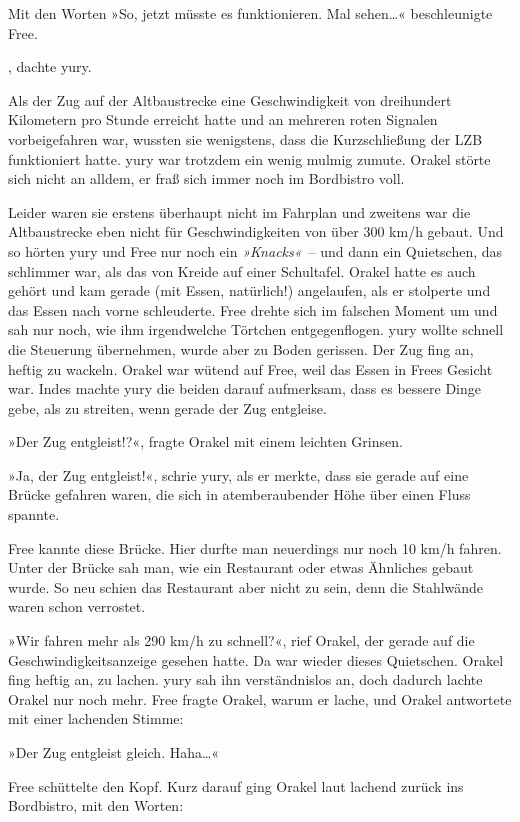 Mit den Worten »So, jetzt müsste es funktionieren. Mal sehen…« beschleunigte Free.

, dachte yury.

Als der Zug auf der Altbaustrecke eine Geschwindigkeit von dreihundert Kilometern pro Stunde erreicht hatte und an mehreren roten Signalen vorbeigefahren war, wussten sie wenigstens, dass die Kurzschließung der LZB funktioniert hatte. yury war trotzdem ein wenig mulmig zumute. Orakel störte sich nicht an alldem, er fraß sich immer noch im Bordbistro voll.

Leider waren sie erstens überhaupt nicht im Fahrplan und zweitens war die Altbaustrecke eben nicht für Geschwindigkeiten von über 300 km/h gebaut. Und so hörten yury und Free nur noch ein \textit{»Knacks«}~– und dann ein Quietschen, das schlimmer war, als das von Kreide auf einer Schultafel. Orakel hatte es auch gehört und kam gerade (mit Essen, natürlich!) angelaufen, als er stolperte und das Essen nach vorne schleuderte. Free drehte sich im falschen Moment um und sah nur noch, wie ihm irgendwelche Törtchen entgegenflogen. yury wollte schnell die Steuerung übernehmen, wurde aber zu Boden gerissen. Der Zug fing an, heftig zu wackeln. Orakel war wütend auf Free, weil das Essen in Frees Gesicht war. Indes machte yury die beiden darauf aufmerksam, dass es bessere Dinge gebe, als zu streiten, wenn gerade der Zug entgleise.

»Der Zug entgleist!?«, fragte Orakel mit einem leichten Grinsen.

»Ja, der Zug entgleist!«, schrie yury, als er merkte, dass sie gerade auf eine Brücke gefahren waren, die sich in atemberaubender Höhe über einen Fluss spannte.

Free kannte diese Brücke. Hier durfte man neuerdings nur noch 10 km/h fahren. Unter der Brücke sah man, wie ein Restaurant oder etwas Ähnliches gebaut wurde. So neu schien das Restaurant aber nicht zu sein, denn die Stahlwände waren schon verrostet.

»Wir fahren mehr als 290 km/h zu schnell?«, rief Orakel, der gerade auf die Geschwindigkeitsanzeige gesehen hatte. Da war wieder dieses Quietschen. Orakel fing heftig an, zu lachen. yury sah ihn verständnislos an, doch dadurch lachte Orakel nur noch mehr. Free fragte Orakel, warum er lache, und Orakel antwortete mit einer lachenden Stimme:

»Der Zug entgleist gleich. Haha…«

Free schüttelte den Kopf. Kurz darauf ging Orakel laut lachend zurück ins Bordbistro, mit den Worten:


